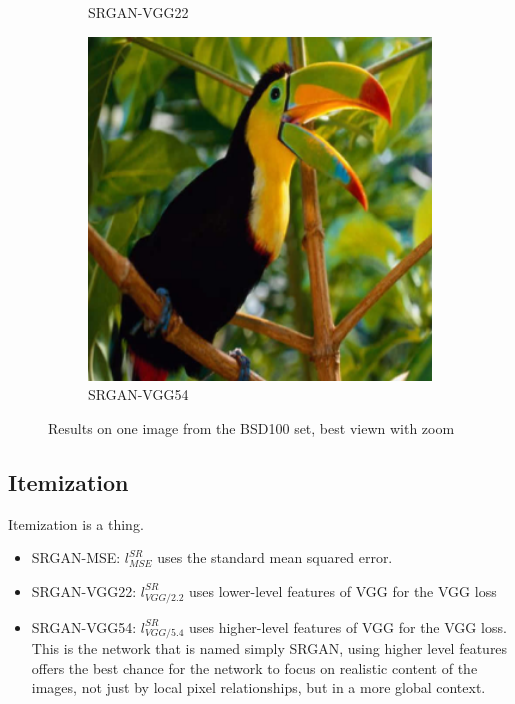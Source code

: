 \documentclass[12pt,onecolumn,oneside,titlepage]{article}
\begin{document}
\begin{figure}[H]
\begin{subfigure}{0.3\textwidth}
  \caption{SRGAN-VGG22}
  \end{subfigure}
  \begin{subfigure}{0.3\textwidth}
  \includegraphics[width=1\textwidth]{bird_HR} 
  \caption{SRGAN-VGG54}
  \end{subfigure}
  \caption{Results on one image from the BSD100 set, best viewn with zoom}
  \label{fig:ex1}
\end{figure}

\subsection{Itemization}

Itemization is a thing.

\begin{itemize}
 \item SRGAN-MSE: $l^{SR}_{MSE}$ uses the standard mean squared error.
 \item SRGAN-VGG22: $l^{SR}_{VGG/2.2}$ uses lower-level features of VGG for the VGG loss
 \item SRGAN-VGG54: $l^{SR}_{VGG/5.4}$ uses higher-level features of VGG for the VGG loss. This is the network that is named simply SRGAN, using higher level features offers the best chance for the network to focus on realistic content of the images, not
 just by local pixel relationships, but in a more global context.
\end{itemize}
\end{document}
